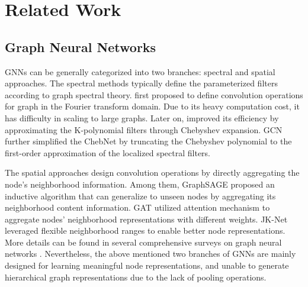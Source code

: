 \documentclass[letterpaper]{article} \usepackage{aaai20}  \usepackage{times}  \usepackage{helvet} \usepackage{courier}  \usepackage[hyphens]{url}  \usepackage{graphicx} \urlstyle{rm} \def\UrlFont{\rm}  \usepackage{graphicx}  \frenchspacing  \setlength{\pdfpagewidth}{8.5in}  \setlength{\pdfpageheight}{11in}
\begin{document}
\section{Related Work}
\subsection{Graph Neural Networks}
GNNs can be generally categorized into two branches: spectral and spatial approaches. The spectral methods typically define the parameterized filters according to graph spectral theory. \cite{bruna2013spectral} first proposed to define convolution operations for graph in the Fourier transform domain. Due to its heavy computation cost, it has difficulty in scaling to large graphs. Later on, \cite{defferrard2016convolutional} improved its efficiency by approximating the K-polynomial filters through Chebyshev expansion. GCN \cite{kipf2016semi} further simplified the ChebNet by truncating the Chebyshev polynomial to the first-order approximation of the localized spectral filters.

The spatial approaches design convolution operations by directly aggregating the node's neighborhood information. Among them, GraphSAGE \cite{hamilton2017inductive} proposed an inductive algorithm that can generalize to unseen nodes by aggregating its neighborhood content information. GAT \cite{velivckovic2017graph} utilized attention mechanism to aggregate nodes' neighborhood representations with different weights. JK-Net \cite{xu2018representation} leveraged flexible neighborhood ranges to enable better node representations. More details can be found in several comprehensive surveys on graph neural networks \cite{zhou2018graph,zhang2018deep,wu2019comprehensive}. Nevertheless, the above mentioned two branches of GNNs are mainly designed for learning meaningful node representations, and unable to generate hierarchical graph representations due to the lack of pooling operations.
\end{document}
